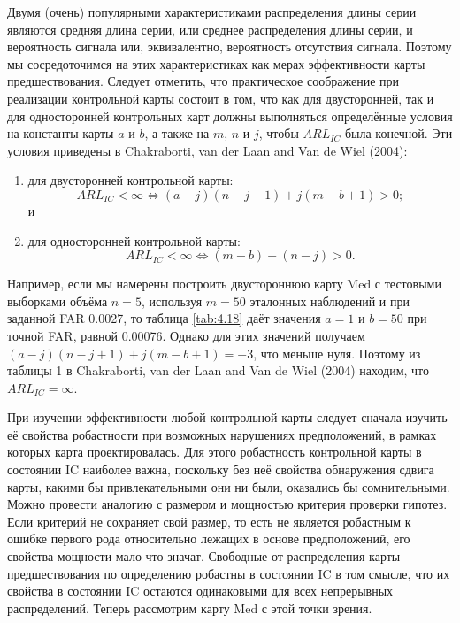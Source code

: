 Двумя (очень) популярными характеристиками распределения длины серии являются средняя длина серии, или среднее распределения длины серии, и вероятность сигнала или, эквивалентно, вероятность отсутствия сигнала. Поэтому мы сосредоточимся на этих характеристиках как мерах эффективности карты предшествования. Следует отметить, что практическое соображение при реализации контрольной карты состоит в том, что как для двусторонней, так и для односторонней контрольных карт должны выполняться определённые условия на константы карты \(a\) и \(b\), а также на \(m\), \(n\) и \(j\), чтобы \(ARL_{IC}\) была конечной. Эти условия приведены в Chakraborti, van der Laan and Van de Wiel (2004):

\begin{enumerate}
	\item для двусторонней контрольной карты:
	\[
		ARL_{IC} < \infty \iff (a - j)(n - j + 1) + j(m - b + 1) > 0;
	\]
	и
	\item для односторонней контрольной карты:
	\[
		ARL_{IC} < \infty \iff (m - b) - (n - j) > 0.
	\]
\end{enumerate}

Например, если мы намерены построить двустороннюю карту Med с тестовыми выборками объёма \(n = 5\), используя \(m = 50\) эталонных наблюдений и при заданной FAR 0.0027, то таблица \ref{tab:4.18} даёт значения \(a = 1\) и \(b = 50\) при точной FAR, равной 0.00076. Однако для этих значений получаем \((a - j)(n - j + 1) + j(m - b + 1) = -3\), что меньше нуля. Поэтому из таблицы 1 в Chakraborti, van der Laan and Van de Wiel (2004) находим, что \(ARL_{IC} = \infty\).

При изучении эффективности любой контрольной карты следует сначала изучить её свойства робастности при возможных нарушениях предположений, в рамках которых карта проектировалась. Для этого робастность контрольной карты в состоянии IC наиболее важна, поскольку без неё свойства обнаружения сдвига карты, какими бы привлекательными они ни были, оказались бы сомнительными. Можно провести аналогию с размером и мощностью критерия проверки гипотез. Если критерий не сохраняет свой размер, то есть не является робастным к ошибке первого рода относительно лежащих в основе предположений, его свойства мощности мало что значат. Свободные от распределения карты предшествования по определению робастны в состоянии IC в том смысле, что их свойства в состоянии IC остаются одинаковыми для всех непрерывных распределений. Теперь рассмотрим карту Med с этой точки зрения.


